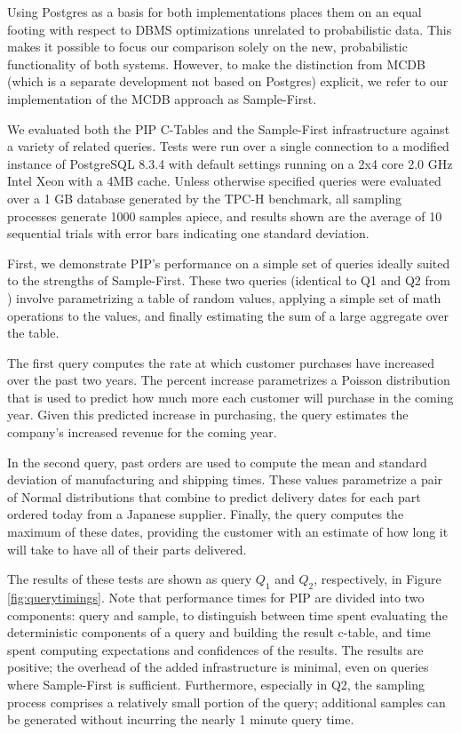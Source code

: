 Using Postgres as a basis for both implementations places them on an equal footing with respect to DBMS optimizations unrelated to probabilistic data.  This makes it possible to focus our comparison solely on the new, probabilistic functionality of both systems.  However, to make the distinction from MCDB (which is a separate development not based on Postgres) explicit, we refer to our implementation of the MCDB approach as Sample-First.

We evaluated both the PIP C-Tables and the Sample-First infrastructure against a variety of related queries.  Tests were run over a single connection to a modified instance of PostgreSQL 8.3.4 with default settings running on a 2x4 core 2.0 GHz Intel Xeon with a 4MB cache.  Unless otherwise specified queries were evaluated over a 1 GB database generated by the TPC-H benchmark, all sampling processes generate 1000 samples apiece, and results shown are the average of 10 sequential trials with error bars indicating one standard deviation.

First, we demonstrate PIP's performance on a simple set of queries ideally suited to the strengths of Sample-First.  These two queries (identical to Q1 and Q2 from \cite{MCDB}) involve pa\-ra\-me\-tri\-zing a table of random values, applying a simple set of math operations to the values, and finally estimating the sum of a large aggregate over the table.  

The first query computes the rate at which customer purchases have increased over the past two years.  The percent increase parametrizes a Poisson distribution that is used to predict how much more each customer will purchase in the coming year.  Given this predicted increase in purchasing, the query estimates the company's increased revenue for the coming year.

In the second query, past orders are used to compute the mean and standard deviation of manufacturing and shipping times.  These values parametrize a pair of Normal distributions that combine to predict delivery dates for each part ordered today from a Japanese supplier.  Finally, the query computes the maximum of these dates, providing the customer with an estimate of how long it will take to have all of their parts delivered.

The results of these tests are shown as query $Q_1$ and $Q_2$, respectively, in Figure \ref{fig:querytimings}.  Note that performance times for PIP are divided into two components: query and sample, to distinguish between time spent evaluating the deterministic components of a query and building the result c-table, and time spent computing expectations and confidences of the results.  The results are positive; the overhead of the added infrastructure is minimal, even on queries where Sample-First is sufficient.  Furthermore, especially in Q2, the sampling process comprises a relatively small portion of the query; additional samples can be generated without incurring the nearly 1 minute query time.


